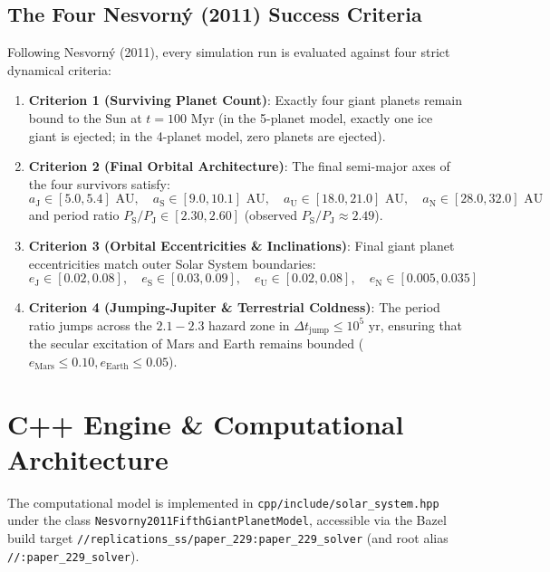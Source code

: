 \documentclass[11pt,a4paper]{article}
\begin{document}
\subsection{The Four Nesvorn\'y (2011) Success Criteria}
Following Nesvorn\'y (2011), every simulation run is evaluated against four strict dynamical criteria:
\begin{enumerate}
    \item \textbf{Criterion 1 (Surviving Planet Count)}: Exactly four giant planets remain bound to the Sun at $t = 100\text{ Myr}$ (in the 5-planet model, exactly one ice giant is ejected; in the 4-planet model, zero planets are ejected).
    \item \textbf{Criterion 2 (Final Orbital Architecture)}: The final semi-major axes of the four survivors satisfy:
    \begin{equation}
    a_{\text{J}} \in [5.0, 5.4]\text{ AU},\quad a_{\text{S}} \in [9.0, 10.1]\text{ AU},\quad a_{\text{U}} \in [18.0, 21.0]\text{ AU},\quad a_{\text{N}} \in [28.0, 32.0]\text{ AU}
    \end{equation}
    and period ratio $P_{\text{S}}/P_{\text{J}} \in [2.30, 2.60]$ (observed $P_{\text{S}}/P_{\text{J}} \approx 2.49$).
    \item \textbf{Criterion 3 (Orbital Eccentricities \& Inclinations)}: Final giant planet eccentricities match outer Solar System boundaries:
    \begin{equation}
    e_{\text{J}} \in [0.02, 0.08],\quad e_{\text{S}} \in [0.03, 0.09],\quad e_{\text{U}} \in [0.02, 0.08],\quad e_{\text{N}} \in [0.005, 0.035]
    \end{equation}
    \item \textbf{Criterion 4 (Jumping-Jupiter \& Terrestrial Coldness)}: The period ratio jumps across the $2.1 - 2.3$ hazard zone in $\Delta t_{\text{jump}} \le 10^5\text{ yr}$, ensuring that the secular excitation of Mars and Earth remains bounded ($e_{\text{Mars}} \le 0.10, e_{\text{Earth}} \le 0.05$).
\end{enumerate}

\section{C++ Engine \& Computational Architecture}
The computational model is implemented in \texttt{cpp/include/solar\_system.hpp} under the class \texttt{Nesvorny2011FifthGiantPlanetModel}, accessible via the Bazel build target \texttt{//replications\_ss/paper\_229:paper\_229\_solver} (and root alias \texttt{//:paper\_229\_solver}).
\end{document}
